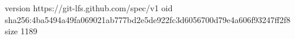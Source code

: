 version https://git-lfs.github.com/spec/v1
oid sha256:4ba5494a49fa069021ab777bd2e5de922fc3d6056700d79e4a606f93247ff2f8
size 1189
